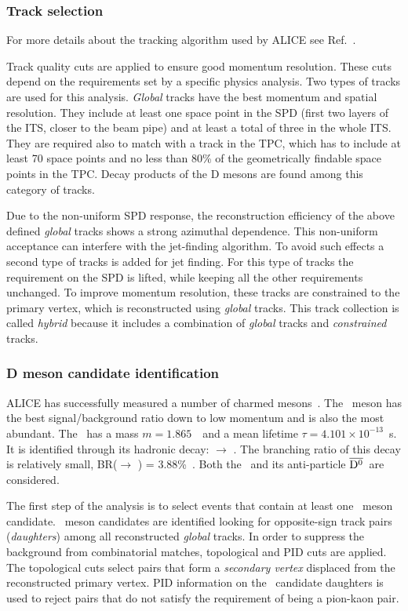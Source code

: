\documentclass[a4paper]{jpconf}
\begin{document}
\subsubsection{Track selection}
For more details about the tracking algorithm used by ALICE see Ref.~\cite{ALICE:2014b}.

Track quality cuts are applied to ensure good momentum resolution. These cuts
depend on the requirements set by a specific physics analysis.
Two types of tracks are used for this analysis. \emph{Global} tracks have the best
momentum and spatial resolution. They include at least one space point in the SPD (first two
layers of the ITS, closer to the beam pipe) and at least a total of three in the whole ITS. They are required also to
match with a track in the TPC, which has to include at least 70 space points and no less than 80\% of the geometrically findable 
space points in the TPC. Decay products of the D mesons are found among this category of tracks.

Due to the non-uniform SPD response, the reconstruction efficiency of the above defined \emph{global} tracks shows a strong azimuthal dependence.
This non-uniform acceptance can interfere with the jet-finding algorithm. To avoid such effects a second type of tracks is added for jet finding.
For this type of tracks the requirement on the SPD is lifted, while keeping all the other requirements unchanged. To improve momentum resolution,
these tracks are constrained to the primary vertex, which is reconstructed using \emph{global} tracks. This track collection is called \emph{hybrid} because
it includes a combination of \emph{global} tracks and \emph{constrained} tracks.

\subsubsection{D meson candidate identification}
ALICE has successfully measured a number of charmed mesons~\cite{ALICE:2012d, ALICE:2012e}.
The \Dzero\ meson has the best signal/background ratio down to low momentum and
is also the most abundant. The \Dzero\ has a mass $m=1.865$~\GeVcsq\ and a mean lifetime $\tau=4.101 \times 10^{-13}$~s.
It is identified through its hadronic decay: \Dzero $\rightarrow$ \pip \kam. The branching ratio of this decay
is relatively small, BR(\Dzero $\rightarrow$ \pip \kam) = 3.88\%~\cite{PDG:2014}. Both the \Dzero\ and its
anti-particle $\overline{\mathrm{D^{0}}}$~are considered.

The first step of the analysis is to select events that contain at least one \Dzero\ meson candidate.
\Dzero\ meson candidates are identified looking for opposite-sign track pairs (\emph{daughters}) among all reconstructed \emph{global} tracks.
In order to suppress the background from combinatorial matches, topological and PID cuts are applied.
The topological cuts select pairs that form a \emph{secondary vertex} displaced from the reconstructed
primary vertex. 
PID information on the \Dzero\ candidate daughters is used to reject pairs that do not satisfy the requirement of being a pion-kaon pair.
\end{document}
